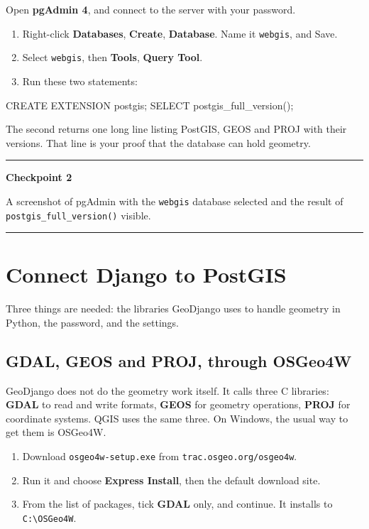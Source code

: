 \documentclass{article}
\newcommand{\cd}[1]{\texttt{#1}}
\newenvironment{keypoint}[1]
  {\par\vspace{.7em}\noindent\rule{\linewidth}{.6pt}\par\vspace{.15em}
   \noindent\textbf{#1}\par\nobreak\vspace{-.3em}}
  {\par\vspace{.15em}\noindent\rule{\linewidth}{.6pt}\par\vspace{.7em}}
\begin{document}
Open \textbf{pgAdmin 4}, and connect to the server with your password.

\begin{enumerate}
  \item Right-click \textbf{Databases}, \textbf{Create},
        \textbf{Database}. Name it \cd{webgis}, and Save.
  \item Select \cd{webgis}, then \textbf{Tools}, \textbf{Query Tool}.
  \item Run these two statements:
\end{enumerate}

\begin{code}
CREATE EXTENSION postgis;
SELECT postgis_full_version();
\end{code}

The second returns one long line listing PostGIS, GEOS and PROJ with their
versions. That line is your proof that the database can hold geometry.

\begin{keypoint}{Checkpoint 2}
A screenshot of pgAdmin with the \cd{webgis} database selected and the
result of \cd{postgis\_full\_version()} visible.
\end{keypoint}


\section{Connect Django to PostGIS}

Three things are needed: the libraries GeoDjango uses to handle geometry
in Python, the password, and the settings.

\subsection{GDAL, GEOS and PROJ, through OSGeo4W}

GeoDjango does not do the geometry work itself. It calls three C
libraries: \textbf{GDAL} to read and write formats, \textbf{GEOS} for
geometry operations, \textbf{PROJ} for coordinate systems. QGIS uses the
same three. On Windows, the usual way to get them is OSGeo4W.

\begin{enumerate}
  \item Download \cd{osgeo4w-setup.exe} from \cd{trac.osgeo.org/osgeo4w}.
  \item Run it and choose \textbf{Express Install}, then the default
        download site.
  \item From the list of packages, tick \textbf{GDAL} only, and continue.
        It installs to \cd{C:\textbackslash OSGeo4W}.
\end{enumerate}
\end{document}
